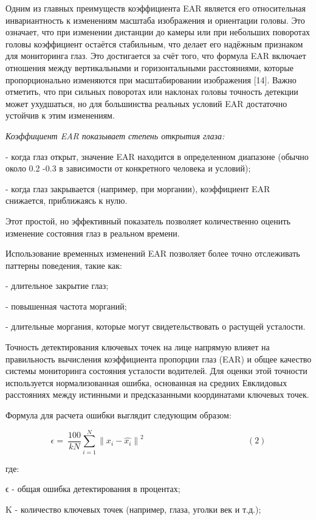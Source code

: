 Одним из главных преимуществ коэффициента EAR является его относительная
инвариантность к изменениям масштаба изображения и ориентации головы.
Это означает, что при изменении дистанции до камеры или при небольших
поворотах головы коэффициент остаётся стабильным, что делает его
надёжным признаком для мониторинга глаз. Это достигается за счёт того,
что формула EAR включает отношения между вертикальными и горизонтальными
расстояниями, которые пропорционально изменяются при масштабировании
изображения {[}14{]}. Важно отметить, что при сильных поворотах или
наклонах головы точность детекции может ухудшаться, но для большинства
реальных условий EAR достаточно устойчив к этим изменениям.

\emph{Коэффициент EAR показывает степень открытия глаза:}

- когда глаз открыт, значение EAR находится в определенном диапазоне
(обычно около 0.2 -0.3 в зависимости от конкретного человека и условий);

- когда глаз закрывается (например, при моргании), коэффициент EAR
снижается, приближаясь к нулю.

Этот простой, но эффективный показатель позволяет количественно оценить
изменение состояния глаз в реальном времени.

Использование временных изменений EAR позволяет более точно отслеживать
паттерны поведения, такие как:

- длительное закрытие глаз;

- повышенная частота морганий;

- длительные моргания, которые могут свидетельствовать о растущей
усталости.

Точность детектирования ключевых точек на лице напрямую влияет на
правильность вычисления коэффициента пропорции глаз (EAR) и общее
качество системы мониторинга состояния усталости водителей. Для оценки
этой точности используется нормализованная ошибка, основанная на средних
Евклидовых расстояниях между истинными и предсказанными координатами
ключевых точек.

Формула для расчета ошибки выглядит следующим образом:

\[\epsilon = \ \frac{100}{kN}\sum_{i = 1}^{N}{\parallel x_{i} - \widehat{x_{i}} \parallel}^{2}\ \ \ \ \ \ \ \ \ \ \ \ \ \ \ \ \ \ \ \ \ \ \ \ \ \ \ \ \ \ \ \ \ \ \ \ \ \ \ \ \ \ \ \ \ \ \ \ \ \ \ \ \ \ \ (2)\]

где:

ϵ - общая ошибка детектирования в процентах;

Κ - количество ключевых точек (например, глаза, уголки век и т.д.);

